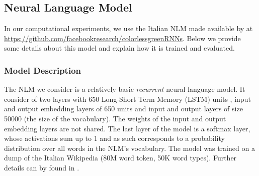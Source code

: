 \subsection{Neural Language Model}

In our computational experiments, we use the Italian NLM made available by \citet{Gulordava:etal:2018} at \url{https://github.com/facebookresearch/colorlessgreenRNNs}.
Below we provide some details about this model and explain how it is trained and evaluated.

\subsubsection{Model Description}
The NLM we consider is a relatively basic \emph{recurrent} neural language model.
It consider of two layers with 650 Long-Short Term Memory (LSTM) units \citep{Hochreiter:Schmidhuber:1997}, input and output embedding layers of 650 units and input and output layers of size 50000 (the size of the vocabulary). The weights of the input and output embedding layers are not shared.
The last layer of the model is a softmax layer, whose activations sum up to 1 and as such corresponds to a probability distribution over all words in the NLM's vocabulary. 
The model was trained on a dump of the Italian Wikipedia (80M word token, 50K word types). 
Further details can by found in \citet{Gulordava:etal:2018}.

% 
